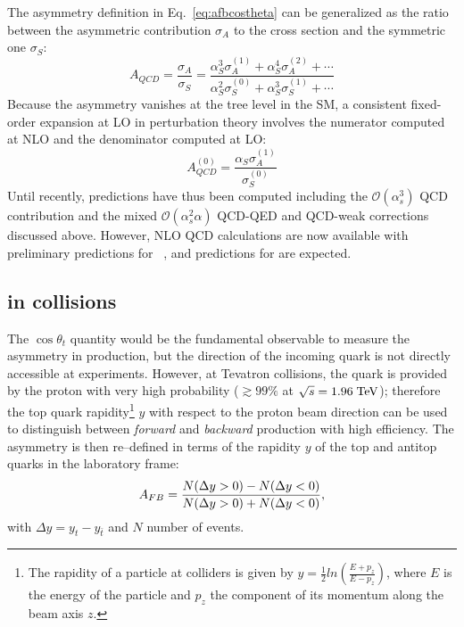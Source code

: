 The asymmetry definition in Eq.~\ref{eq:afbcostheta} can be
generalized as the ratio between the asymmetric contribution
$\sigma_A$ to the cross section and the symmetric one $\sigma_S$:
\begin{equation}
  A_{QCD} = \frac{\sigma_A}{\sigma_S} = 
  \frac{\alpha_S^3\sigma_A^{(1)}+\alpha_S^4\sigma_A^{(2)}+\cdots{}}
  {\alpha_S^2\sigma_S^{(0)}+\alpha_S^3\sigma_S^{(1)}+\cdots{}}
\end{equation}
Because the asymmetry vanishes at the tree level in the SM, a
consistent fixed-order expansion at LO in perturbation theory involves the
numerator computed at NLO and the denominator computed at LO:
\begin{equation}
  A_{QCD}^{(0)}=\frac{\alpha_S\sigma_A^{(1)}}{\sigma_S^{(0)}}
\end{equation}
Until recently, predictions have thus been computed including the
$\mathcal{O}(\alpha_s^3)$ QCD contribution and the mixed
$\mathcal{O}(\alpha_s^2\alpha)$ QCD-QED and QCD-weak corrections
discussed above. However, NLO QCD calculations are now available with
preliminary predictions for \afb{}~\cite{mitov}, and predictions for
\ac{} are expected.

\subsection{\afb{} in \ppbar{} collisions}

The $\cos\theta_t$ quantity would be the fundamental observable to
measure the asymmetry in \ttbar{} production, but the direction of the
incoming quark is not directly accessible at experiments. However, at
Tevatron \ppbar{} collisions, the quark is provided by the proton with
very high probability ($\gtrsim{}99\%$ at $\sqrt{s}=1.96\; \mathrm{TeV}{}$);
therefore the top quark rapidity\footnote{The rapidity of a particle
  at colliders is given by $y=\frac{1}{2}ln(\frac{E+p_z}{E-p_z})$,
  where $E$ is the energy of the particle and $p_z$ the component of
  its momentum along the beam axis $z$.} $y$ with respect to the
proton beam direction can be used to distinguish between {\it forward}
and {\it backward} production with high efficiency.
The asymmetry \afb{} is then re--defined in terms of the rapidity $y$
of the top and antitop quarks in the laboratory frame: 
\begin{equation}
\label{eq:afb}
A_{FB}{}=\frac{N(\Delta{}y>0)-N(\Delta{}y<0)}{N(\Delta{}y>0)+N(\Delta{}y<0)},
\end{equation}
with $\Delta{}y=y_t - y_{\bar{t}}$ and $N$ number of events.

